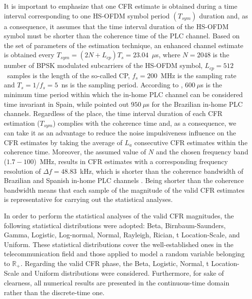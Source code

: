 \documentclass[journal]{IEEEtran}
\begin{document}
It is important to emphasize that one \ac{CFR} estimate is obtained during a time interval corresponding to one \ac{HS-OFDM} symbol period $(T_{sym})$ duration and, as a consequence, it assumes that the time interval duration of the \ac{HS-OFDM} symbol must be shorter than the coherence time of the \ac{PLC} channel. Based on the set of parameters of the estimation technique, an enhanced channel estimate is obtained every $T_{sym}=(2N + L_{cp}) T_s = 23.04$~$\mu$s, where $N=2048$ is the number of \ac{BPSK} modulated subcarriers of the \ac{HS-OFDM} symbol, $L_{cp}=512$~samples is the length of the so-called \ac{CP}, $f_s=200$~MHz is the sampling rate and $T_s=1/f_s=5$~ns is the sampling period. According to \cite{Canete:AIPLC}, $600~\mu$s is the minimum time period within which the in-home \ac{PLC} channel can be considered time invariant in Spain, while \cite{Thiago:Characterization} pointed out $950~\mu$s for the Brazilian in-home \ac{PLC} channels. Regardless of the place, the time interval duration of each \ac{CFR} estimation ($T_{sym}$) complies with the coherence time and, as a consequence, we can take it as an advantage to reduce the noise impulsiveness influence on the \ac{CFR} estimates by taking the average of $L_a$ consecutive \ac{CFR} estimates within the coherence time. Moreover, the assumed value of $N$ and the chosen frequency band ($1.7-100$)~MHz, results in \ac{CFR} estimates with a corresponding frequency resolution of $\Delta f=48.83$~kHz, which is shorter than the coherence bandwidth of Brazilian and Spanish in-home PLC channels \cite{Canete:AIPLC,Thiago:Characterization}. Being shorter than the coherence bandwidth means that each sample of  the magnitude of the valid \ac{CFR} estimates is representative for carrying out the statistical analyses. 

In order to perform the statistical analyses of the valid \ac{CFR} magnitudes, the following statistical distributions were adopted: Beta, Birnbaum-Saunders, Gamma, Logistic, Log-normal, Normal, Rayleigh, Rician, t Location-Scale, and Uniform. These statistical distributions cover the well-established ones in the telecommunication field and those applied to model a random variable belonging to $\mathbb{R}_+$. Regarding the valid \ac{CFR} phase, the Beta, Logistic, Normal, t Location-Scale and Uniform distributions were considered. Furthermore, for sake of clearness, all numerical results are presented in the continuous-time domain rather than the discrete-time one. 
\end{document}
